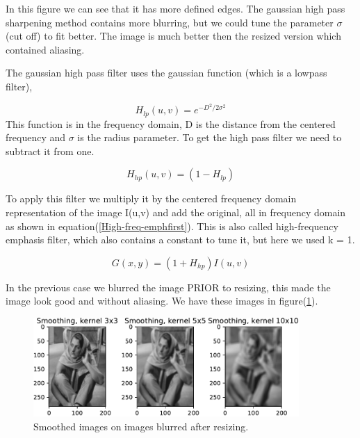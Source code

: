 {In this figure we can see that it has more defined edges. The gaussian high pass sharpening method contains more blurring, but we could tune the parameter $\sigma$(cut off) to fit better. The image is much better then the resized version which contained aliasing.

The gaussian high pass filter uses the gaussian function (which is a lowpass filter),

\begin{equation}
    H_{lp}(u,v) = e^{-D^2/2\sigma^2}
    \label{gausslowp}
\end{equation}
This function is in the frequency domain, D is the distance from the centered frequency and $\sigma$ is the radius parameter. To get the high pass filter we need to subtract it from one.

\begin{equation}
    H_{hp}(u,v) = (1 - H_{lp})
    \label{gausshighp}
\end{equation}

To apply this filter we multiply it by the centered frequency domain representation of the image I(u,v) and add the original, all in frequency domain as shown in equation(\ref{High-freq-emphfirst}). This is also called high-frequency emphasis filter, which also contains a constant to tune it, but here we used k = 1.

\begin{equation}
    G(x,y) =  (1 + H_{hp})I(u,v)
    \label{High-freq-emphfirst}
\end{equation}


In the previous case we blurred the image PRIOR to resizing, this made the image look good and without aliasing. We have these images in figure(\ref{smooth2}).

\begin{figure}[!htb]
    {\centering
        \includegraphics[width=0.90\textwidth]{smoothafter.pdf}
        \caption{Smoothed images on images blurred after resizing.}
        \label{smooth2}
    \par}
    \end{figure}

}
